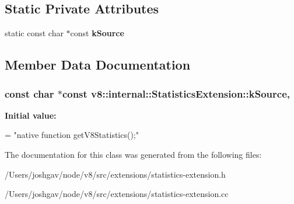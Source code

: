 \subsection*{Static Private Attributes}
\begin{DoxyCompactItemize}
\item 
static const char $\ast$const {\bfseries k\+Source}
\end{DoxyCompactItemize}


\subsection{Member Data Documentation}
\subsubsection[{\texorpdfstring{k\+Source}{kSource}}]{\setlength{\rightskip}{0pt plus 5cm}const char $\ast$const v8\+::internal\+::\+Statistics\+Extension\+::k\+Source\hspace{0.3cm}{\ttfamily [static]}, {\ttfamily [private]}}\hypertarget{classv8_1_1internal_1_1_statistics_extension_a985b7a952f825f1b4eae745b15a2ccf4}{}\label{classv8_1_1internal_1_1_statistics_extension_a985b7a952f825f1b4eae745b15a2ccf4}
{\bfseries Initial value\+:}
\begin{DoxyCode}
=
    \textcolor{stringliteral}{"native function getV8Statistics();"}
\end{DoxyCode}


The documentation for this class was generated from the following files\+:\begin{DoxyCompactItemize}
\item 
/\+Users/joshgav/node/v8/src/extensions/statistics-\/extension.\+h\item 
/\+Users/joshgav/node/v8/src/extensions/statistics-\/extension.\+cc\end{DoxyCompactItemize}
